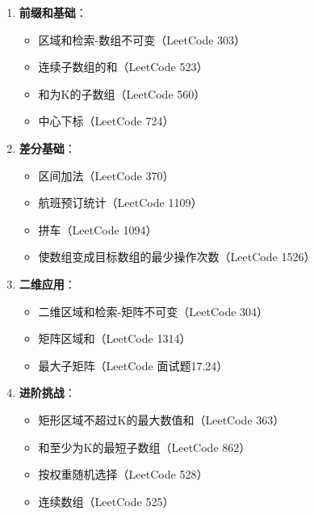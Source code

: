 \documentclass[12pt,a4paper]{article}
\begin{document}
	\begin{enumerate}[leftmargin=*]
		\item \textbf{前缀和基础}：
		\begin{itemize}
			\item 区域和检索-数组不可变（LeetCode 303）
			\item 连续子数组的和（LeetCode 523）
			\item 和为K的子数组（LeetCode 560）
			\item 中心下标（LeetCode 724）
		\end{itemize}
		\item \textbf{差分基础}：
		\begin{itemize}
			\item 区间加法（LeetCode 370）
			\item 航班预订统计（LeetCode 1109）
			\item 拼车（LeetCode 1094）
			\item 使数组变成目标数组的最少操作次数（LeetCode 1526）
		\end{itemize}
		\item \textbf{二维应用}：
		\begin{itemize}
			\item 二维区域和检索-矩阵不可变（LeetCode 304）
			\item 矩阵区域和（LeetCode 1314）
			\item 最大子矩阵（LeetCode 面试题17.24）
		\end{itemize}
		\item \textbf{进阶挑战}：
		\begin{itemize}
			\item 矩形区域不超过K的最大数值和（LeetCode 363）
			\item 和至少为K的最短子数组（LeetCode 862）
			\item 按权重随机选择（LeetCode 528）
			\item 连续数组（LeetCode 525）
		\end{itemize}
	\end{enumerate}
	
\end{document}
